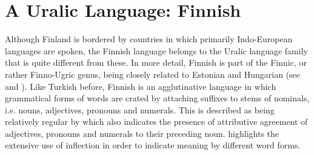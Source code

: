 \documentclass[11pt,a4paper,twoside,openright]{scrbook}
\begin{document}
\newpage


\section{A Uralic Language: Finnish}

Although Finland is bordered by countries in which primarily Indo-European languages are spoken, the Finnish language belongs to the Uralic language family that is quite different from these. In more detail, Finnish is part of the Finnic, or rather Finno-Ugric genus, being closely related to Estonian and Hungarian (see \citet{wals} and \citet{white2008finn}). Like Turkish before, Finnish is an agglutinative language in which grammatical forms of words are crated by attaching suffixes to stems of nominals, i.e. nouns, adjectives, pronouns and numerals. This is described as being relatively regular by \citet{white2008finn} which also indicates the presence of attributive agreement of adjectives, pronouns and numerals to their preceding noun. \citet{karlsson2018finn} highlights the extensive use of inflection in order to indicate meaning by different word forms. 
\end{document}
